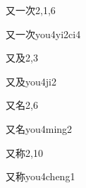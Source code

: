 \begin{entry}{又一次}{2,1,6}
  \begin{phonetics}{又一次}{you4yi2ci4}
  \end{phonetics}
\end{entry}

\begin{entry}{又及}{2,3}
  \begin{phonetics}{又及}{you4ji2}
  \end{phonetics}
\end{entry}

\begin{entry}{又名}{2,6}
  \begin{phonetics}{又名}{you4ming2}
  \end{phonetics}
\end{entry}

\begin{entry}{又称}{2,10}
  \begin{phonetics}{又称}{you4cheng1}
  \end{phonetics}
\end{entry}


